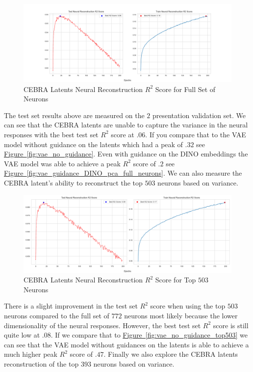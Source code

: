 \documentclass[12pt, letterpaper]{article}
\begin{document}
\begin{figure}[H]
    \centering
    \includegraphics[width=1.0\textwidth]{cebra_x_r2_772_200_epochs_3_layer.png}
    \caption{CEBRA Latents Neural Reconstruction $R^2$ Score for Full Set of Neurons}
    \label{fig:cebra_latents_neural_reconstruction_772}
\end{figure}

The test set results above are measured on the $2$ presentation validation set. We can see that the CEBRA \cite{schneider2023} latents are unable to capture the variance in the neural responses with the best test set $R^2$ score at $.06$. If you compare that to the VAE model without guidance on the latents which had a peak of $.32$ see \hyperref[fig:vae_no_guidance]{Figure~\ref{fig:vae_no_guidance}}. Even with guidance on the DINO \cite{dino} embeddings the VAE model was able to achieve a peak $R^2$ score of $.2$ see \hyperref[fig:vae_guidance_DINO_pca_full_neurons]{Figure~\ref{fig:vae_guidance_DINO_pca_full_neurons}}. We can also measure the CEBRA \cite{schneider2023} latent's ability to reconstruct the top $503$ neurons based on variance.

\begin{figure}[H]
    \centering
    \includegraphics[width=1.0\textwidth]{cebra_x_r2_503_200_epochs_3_layer.png}
    \caption{CEBRA Latents Neural Reconstruction $R^2$ Score for Top $503$ Neurons}
    \label{fig:cebra_latents_neural_reconstruction_503}
\end{figure}

There is a slight improvement in the test set $R^2$ score when using the top $503$ neurons compared to the full set of $772$ neurons most likely because the lower dimensionality of the neural responses. However, the best test set $R^2$ score is still quite low at $.08$. If we compare that to \hyperref[fig:vae_no_guidance_top503]{Figure~\ref{fig:vae_no_guidance_top503}} we can see that the VAE model without guidances on the latents is able to achieve a much higher peak $R^2$ score of $.47$. Finally we also explore the CEBRA \cite{schneider2023} latents reconstruction of the top $393$ neurons based on variance.
\end{document}
